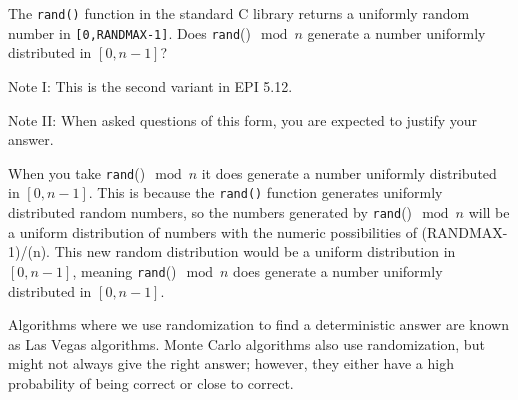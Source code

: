 \documentclass{article}
\begin{document}
\nextprob
The \texttt{rand()} function in the standard C library returns a
uniformly random number in \texttt{[0,RANDMAX-1]}. Does \texttt{rand}()$\mod n$
generate a number uniformly distributed in $[0,n-1]$?

Note I: This is the second variant in EPI 5.12.

Note II: When asked questions of this form, you are expected to justify your
answer.

When you take \texttt{rand}()$\mod n$ it does  generate a number uniformly distributed in $[0,n-1]$. This is because the \texttt{rand()} function generates uniformly distributed random numbers, so the numbers generated by \texttt{rand}()$\mod n$ will be a uniform distribution of numbers with the numeric possibilities of (RANDMAX-1)/(n). This new random distribution would be a uniform distribution in $[0,n-1]$, meaning \texttt{rand}()$\mod n$ does  generate a number uniformly distributed in $[0,n-1]$.


\nextprob

Algorithms where we use randomization to find a deterministic answer are known
as Las Vegas algorithms.  Monte Carlo algorithms also use randomization, but
might not always give the right answer; however, they either have a high
probability of being correct or close to correct.
\end{document}
